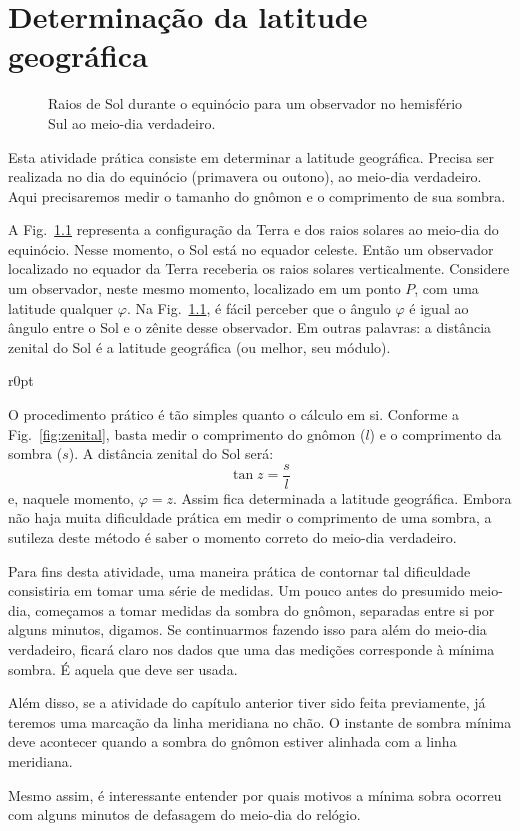 \chapter{Determinação da latitude geográfica}

\begin{figure}[ht]
\centering

\caption{Raios de Sol durante o equinócio para um observador no hemisfério Sul ao meio-dia verdadeiro.}
\label{fig:equinocios}
\end{figure}

Esta atividade prática consiste em determinar a latitude geográfica. Precisa ser realizada no dia do equinócio (primavera ou outono), ao meio-dia verdadeiro. Aqui precisaremos medir o tamanho do gnômon e o comprimento de sua sombra.

A Fig.~\ref{fig:equinocios} representa a configuração da Terra e dos raios solares ao meio-dia do equinócio. Nesse momento, o Sol está no equador celeste. Então um observador localizado no equador da Terra receberia os raios solares verticalmente. Considere um observador, neste mesmo momento, localizado em um ponto $P$, com uma latitude qualquer $\varphi$. Na Fig.~\ref{fig:equinocios}, é fácil perceber que o ângulo $\varphi$ é igual ao ângulo entre o Sol e o zênite desse observador. Em outras palavras: a distância zenital do Sol é a latitude geográfica (ou melhor, seu módulo).

\begin{wrapfigure}[18]{r}{0pt}

\caption{Distância zenital do Sol.}
\label{fig:zenital}
\end{wrapfigure}

O procedimento prático é tão simples quanto o cálculo em si. Conforme a Fig.~\ref{fig:zenital}, basta medir o comprimento do gnômon ($l$) e o comprimento da sombra ($s$). A distância zenital do Sol será:
%
\begin{equation}
\tan z = \frac{s}{l}
\end{equation}
%
e, naquele momento, $\varphi = z$. Assim fica determinada a latitude geográfica. Embora não haja muita dificuldade prática em medir o comprimento de uma sombra, a sutileza deste método é saber o momento correto do meio-dia verdadeiro.

Para fins desta atividade, uma maneira prática de contornar tal dificuldade consistiria em tomar uma série de medidas. Um pouco antes do presumido meio-dia, começamos a tomar medidas da sombra do gnômon, separadas entre si por alguns minutos, digamos. Se continuarmos fazendo isso para além do meio-dia verdadeiro, ficará claro nos dados que uma das medições corresponde à mínima sombra. É aquela que deve ser usada.

Além disso, se a atividade do capítulo anterior tiver sido feita previamente, já teremos uma marcação da linha meridiana no chão. O instante de sombra mínima deve acontecer quando a sombra do gnômon estiver alinhada com a linha meridiana.

Mesmo assim, é interessante entender por quais motivos a mínima sobra ocorreu com alguns minutos de defasagem do meio-dia do relógio.





